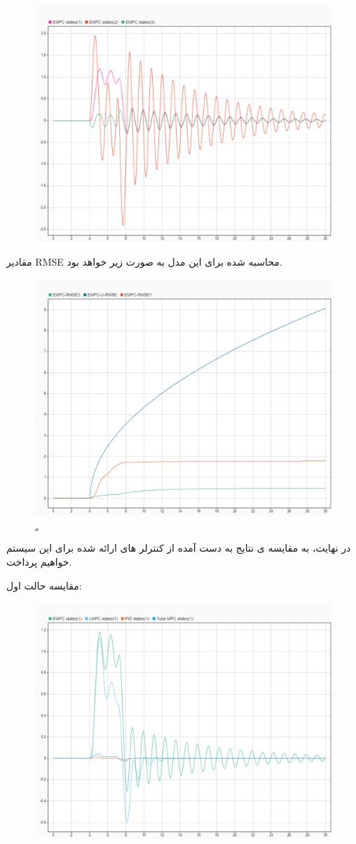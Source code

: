 \begin{figure}[H]
	\centering
	\includegraphics[width=0.7\linewidth]{../img/27}
	\caption{}
	\label{fig:27}
\end{figure}

مقادیر RMSE محاسبه شده برای این مدل به صورت زیر خواهد بود.
\begin{figure}[H]
	\centering
	\includegraphics[width=0.7\linewidth]{../img/28}
	\caption{ٍ}
	\label{fig:28}
\end{figure}

در نهایت، به مقایسه ی نتایج به دست آمده از کنترلر های ارائه شده برای این سیستم خواهیم پرداخت.

مقایسه حالت اول:
\begin{figure}[H]
	\centering
	\includegraphics[width=0.7\linewidth]{../img/29}
	\caption{}
	\label{fig:29}
\end{figure}

